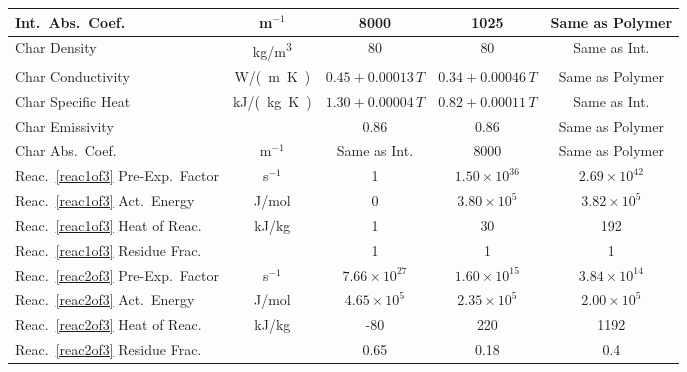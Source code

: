 \begin{table}[!h]
\begin{tabular}{|l|c|c|c|c|}
Int.~Abs.~Coef.                          & m$^{-1}$      & 8000                    & 1025                    & Same as Polymer          \\ \hline
Char Density                             & \unit{kg/m^3}      & 80                      & 80                      & Same as Int.             \\ \hline
Char Conductivity                        & \unit{W/(m.K)}& $0.45+0.00013 \, T$     & $0.34+0.00046  \, T$    & Same as Polymer          \\ \hline
Char Specific Heat                       & \unit{kJ/(kg.K)}       & $1.30+0.00004 \, T$     & $0.82+0.00011 \, T$     & Same as Int.             \\ \hline
Char Emissivity                          &               & 0.86                    & 0.86                    & Same as Polymer          \\ \hline
Char Abs.~Coef.                          & m$^{-1}$      & Same as Int.            & 8000                    & Same as Polymer          \\ \hline
Reac.~\ref{reac1of3} Pre-Exp.~Factor     & s$^{-1}$      & 1                       & $1.50\times 10^{36}$    & $2.69\times 10^{42}$     \\ \hline
Reac.~\ref{reac1of3} Act.~Energy         & J/mol       & 0                       & $3.80\times 10^5$       & $3.82\times 10^5$        \\ \hline
Reac.~\ref{reac1of3} Heat of Reac.       & kJ/kg         & 1                       & 30                      & 192                      \\ \hline
Reac.~\ref{reac1of3} Residue Frac.       &               & 1                       & 1                       & 1                        \\ \hline
Reac.~\ref{reac2of3} Pre-Exp.~Factor     & s$^{-1}$      & $7.66\times 10^{27}$    & $1.60\times 10^{15}$    & $3.84\times 10^{14}$     \\ \hline
Reac.~\ref{reac2of3} Act.~Energy         & J/mol       & $4.65\times 10^5$       & $2.35\times 10^5$       & $2.00\times 10^5$        \\ \hline
Reac.~\ref{reac2of3} Heat of Reac.       & kJ/kg         & -80                     & 220                     & 1192                     \\ \hline
Reac.~\ref{reac2of3} Residue Frac.       &               & 0.65                    & 0.18                    & 0.4                      \\ \hline

\end{tabular}
\end{table}

